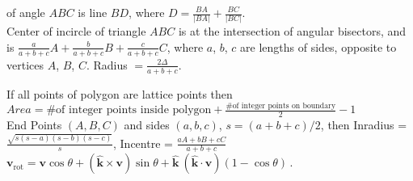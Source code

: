  of angle $ABC$ is line $BD$, where $D = \frac{BA}{|BA|} + \frac{BC}{|BC|}$. \\
Center of incircle of triangle $ABC$ is at the intersection of angular
bisectors, and is $\frac{a}{a+b+c} A + \frac{b}{a+b+c} B + \frac{c}{a+b+c} C$,
where $a$, $b$, $c$ are lengths of sides, opposite to vertices $A$, $B$, $C$.
Radius $= \frac{2\Delta}{a+b+c}$.
 
 If all points of polygon are lattice points then $Area = \text{\# of integer points inside polygon} + \frac{\text{\# of integer points on boundary}}{2} -1$ \\
 End Points $(A,B,C)$ and sides $(a,b,c)$, $s=(a+b+c)/2$, then Inradius = $\frac{\sqrt{s(s-a)(s-b)(s-c)}}{s}$, Incentre = $\frac{aA+bB+cC}{a+b+c}$ \\

 $\mathbf{v}_\mathrm{rot} = \mathbf{v} \cos\theta + (\mathbf{\hat{k}} \times \mathbf{v})\sin\theta + \mathbf{\hat{k}} ~(\mathbf{\hat{k}} \cdot \mathbf{v}) (1 - \cos\theta)\,.$